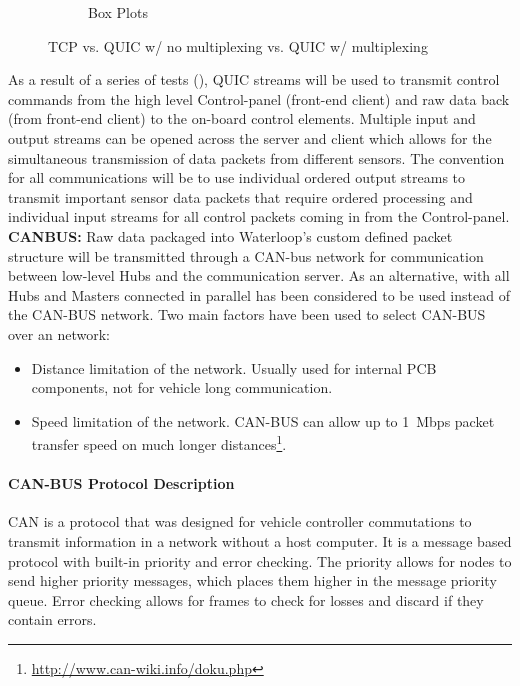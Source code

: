 \begin{figure}
\begin{subfigure}{0.7\textwidth}
  \caption{Box Plots}
\end{subfigure}
	\caption{TCP vs. QUIC w/ no multiplexing vs. QUIC w/ multiplexing}
  \label{fig:tcp_vs_quic}
\end{figure}
As a result of a series of tests (), QUIC streams will be used to transmit control commands from the high level Control-panel (front-end client) and raw data back (from front-end client) to the on-board control elements. Multiple input and output streams can be opened across the server and client which allows for the simultaneous transmission of data packets from different sensors. The convention for all communications will be to use individual ordered output streams to transmit important sensor data packets that require ordered processing and individual input streams for all control packets coming in from the Control-panel.\\

\noindent\textbf{CANBUS:} Raw data packaged into Waterloop's custom defined packet structure will be transmitted through a CAN-bus network for communication between low-level Hubs and the communication server. As an alternative, \itc with all Hubs and Masters connected in parallel has been considered to be used instead of the CAN-BUS network. Two main factors have been used to select CAN-BUS over an \itc network:
\begin{itemize}
	\item Distance limitation of the \itc network. Usually used for internal PCB components, not for vehicle long communication.
    \item Speed limitation of the \itc network. CAN-BUS can allow up to \SI{1}{Mbps} packet transfer speed on much longer distances\footnote{\url{http://www.can-wiki.info/doku.php}}.
\end{itemize}

\paragraph{CAN-BUS Protocol Description}
CAN is a protocol that was designed for vehicle controller commutations to transmit information in a network without a host computer. It is a message based protocol with built-in priority and error checking. The priority allows for nodes to send higher priority messages, which places them higher in the message priority queue. Error checking allows for frames to check for losses and discard if they contain errors.

